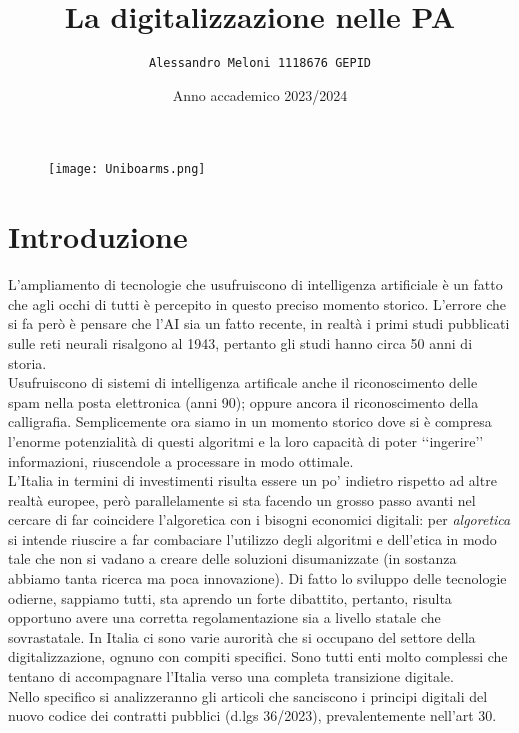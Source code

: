 \documentclass{article}
\title{\huge\textbf{La digitalizzazione nelle PA}}
\author{\texttt{Alessandro Meloni 1118676 GEPID}}
\date{Anno accademico 2023/2024}
\begin{document}
\begin{figure}
    \centering
    \texttt{[image: Uniboarms.png]}
\end{figure}
\maketitle

\centering \tableofcontents

\newpage\centering
\section{Introduzione}
\begin{justify}
L'ampliamento di tecnologie che usufruiscono di intelligenza artificiale è un fatto che agli occhi di tutti è percepito in questo preciso momento storico. L'errore che si fa però è pensare che l'AI sia un fatto recente, in realtà i primi studi pubblicati sulle reti neurali risalgono al 1943, pertanto gli studi hanno circa 50 anni di storia.\citep{mcculloch1943logical}\\ Usufruiscono di sistemi di intelligenza artificale anche il riconoscimento delle spam nella posta elettronica (anni 90); oppure ancora il riconoscimento della calligrafia. Semplicemente ora siamo in un momento storico dove si è compresa l'enorme potenzialità di questi algoritmi e la loro capacità di poter ‘‘ingerire’’ informazioni, riuscendole a processare in modo ottimale.\\
L'Italia in termini di investimenti risulta essere un po' indietro rispetto ad altre realtà europee, però parallelamente si sta facendo un grosso passo avanti nel cercare di far coincidere l'algoretica con i bisogni economici digitali: per \textit{algoretica} si intende riuscire a far combaciare l'utilizzo degli algoritmi e dell'etica in modo tale che non si vadano a creare delle soluzioni disumanizzate (in sostanza abbiamo tanta ricerca ma poca innovazione).
Di fatto lo sviluppo delle tecnologie odierne, sappiamo tutti, sta aprendo un forte dibattito, pertanto, risulta opportuno avere una corretta regolamentazione sia a livello statale che sovrastatale.
In Italia ci sono varie aurorità che si occupano del settore della digitalizzazione, ognuno con compiti specifici.
Sono tutti enti molto complessi che tentano di accompagnare l'Italia verso una completa transizione digitale.\\
Nello specifico si analizzeranno gli articoli che sanciscono i principi digitali del nuovo codice dei contratti pubblici (d.lgs 36/2023), prevalentemente nell'art 30.\\

\end{justify}
\end{document}

